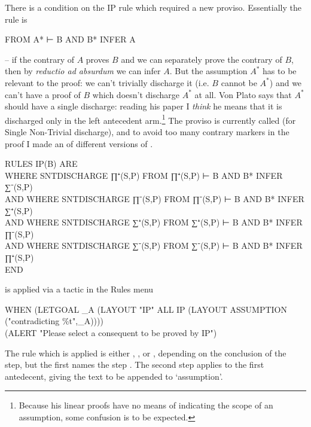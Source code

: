 There is a condition on the IP rule which required a new proviso. Essentially the rule is
\begin{japeish}
FROM A* ⊢ B AND B* INFER A
\end{japeish}
-- if the contrary of $A$ proves $B$ and we can separately prove the contrary of $B$, then by \emph{reductio ad absurdum} we can infer $A$. But the assumption $A^{*}$ has to be relevant to the proof: we can't trivially discharge it (i.e. $B$ cannot be $A^{*}$) and we can't have a proof of $B$ which doesn't discharge $A^{*}$ at all. Von Plato says that $A^{*}$ should have a single discharge: reading his paper I \emph{think} he means that it is discharged only in the left antecedent arm.\footnote{Because his linear proofs have no means of indicating the scope of an assumption, some confusion is to be expected.} The proviso is currently called  (for Single Non-Trivial discharge), and to avoid too many contrary markers in the proof I made an  of different versions of .
\begin{japeish}
RULES IP(B) ARE \\
\tab\tab WHERE SNTDISCHARGE ∏⁺(S,P) FROM ∏⁺(S,P) ⊢ B AND B* INFER ∑⁻(S,P) \\ 
 AND WHERE SNTDISCHARGE ∏⁻(S,P) FROM ∏⁻(S,P) ⊢ B AND B* INFER ∑⁺(S,P)  \\
 AND WHERE SNTDISCHARGE ∑⁺(S,P) FROM ∑⁺(S,P) ⊢ B AND B* INFER ∏⁻(S,P)  \\
 AND WHERE SNTDISCHARGE ∑⁻(S,P) FROM ∑⁻(S,P) ⊢ B AND B* INFER ∏⁺(S,P) \\
END
\end{japeish}
 is applied via a tactic in the Rules menu
\begin{japeish}
WHEN (LETGOAL \_A (LAYOUT "IP" ALL IP (LAYOUT ASSUMPTION ("contradicting \%t",\_A)))) \\
\tab\tab\tab                  (ALERT "Please select a consequent to be proved by IP") \\
\end{japeish}
The rule which is applied is either , ,  or , depending on the conclusion of the step, but the first  names the step . The second step applies  to the first antedecent, giving the text to be appended to `assumption'.


